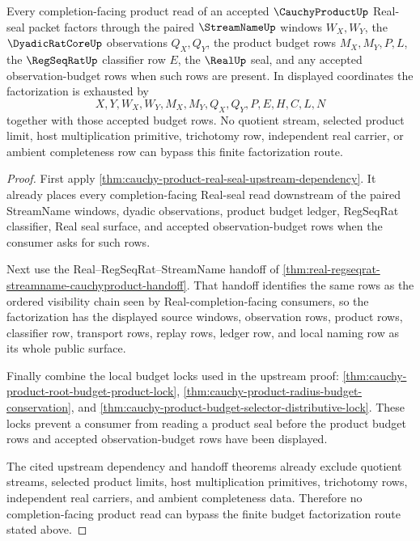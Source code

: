 \begin{theorem}
\label{thm:cauchy-product-real-seal-upstream-budget-factorization}
Every completion-facing product read of an accepted $\CauchyProductUp$ Real-seal packet factors through the paired $\StreamNameUp$ windows $W_X,W_Y$, the $\DyadicRatCoreUp$ observations $Q_X,Q_Y$, the product budget rows $M_X,M_Y,P,L$, the $\RegSeqRatUp$ classifier row $E$, the $\RealUp$ seal, and any accepted observation-budget rows when such rows are present. In displayed coordinates the factorization is exhausted by
$$
X,Y,W_X,W_Y,M_X,M_Y,Q_X,Q_Y,P,E,H,C,L,N
$$
together with those accepted budget rows. No quotient stream, selected product limit, host multiplication primitive, trichotomy row, independent real carrier, or ambient completeness row can bypass this finite factorization route.
\end{theorem}
\begin{proof}
First apply \autoref{thm:cauchy-product-real-seal-upstream-dependency}. It already places every completion-facing Real-seal read downstream of the paired StreamName windows, dyadic observations, product budget ledger, RegSeqRat classifier, Real seal surface, and accepted observation-budget rows when the consumer asks for such rows.

Next use the Real--RegSeqRat--StreamName handoff of \autoref{thm:real-regseqrat-streamname-cauchyproduct-handoff}. That handoff identifies the same rows as the ordered visibility chain seen by Real-completion-facing consumers, so the factorization has the displayed source windows, observation rows, product rows, classifier row, transport rows, replay rows, ledger row, and local naming row as its whole public surface.

Finally combine the local budget locks used in the upstream proof: \autoref{thm:cauchy-product-root-budget-product-lock}, \autoref{thm:cauchy-product-radius-budget-conservation}, and \autoref{thm:cauchy-product-budget-selector-distributive-lock}. These locks prevent a consumer from reading a product seal before the product budget rows and accepted observation-budget rows have been displayed.

The cited upstream dependency and handoff theorems already exclude quotient streams, selected product limits, host multiplication primitives, trichotomy rows, independent real carriers, and ambient completeness data. Therefore no completion-facing product read can bypass the finite budget factorization route stated above.
\end{proof}

